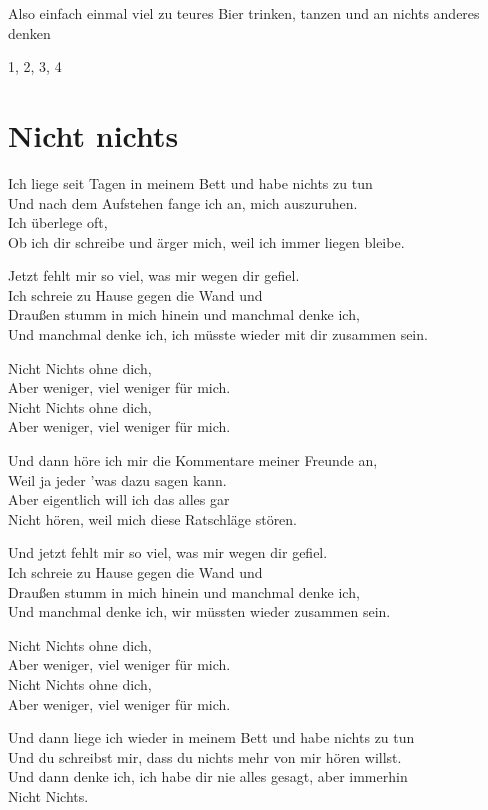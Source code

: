 \documentclass[]{book}
\begin{document}
Also einfach einmal viel zu teures Bier trinken, tanzen und an nichts anderes denken

1, 2, 3, 4

\hypertarget{nicht-nichts-1}{%
\section{Nicht nichts}\label{nicht-nichts-1}}

Ich liege seit Tagen in meinem Bett und habe nichts zu tun\\
Und nach dem Aufstehen fange ich an, mich auszuruhen.\\
Ich überlege oft,\\
Ob ich dir schreibe und ärger mich, weil ich immer liegen bleibe.

Jetzt fehlt mir so viel, was mir wegen dir gefiel.\\
Ich schreie zu Hause gegen die Wand und\\
Draußen stumm in mich hinein und manchmal denke ich,\\
Und manchmal denke ich, ich müsste wieder mit dir zusammen sein.

Nicht Nichts ohne dich,\\
Aber weniger, viel weniger für mich.\\
Nicht Nichts ohne dich,\\
Aber weniger, viel weniger für mich.

Und dann höre ich mir die Kommentare meiner Freunde an,\\
Weil ja jeder 'was dazu sagen kann.\\
Aber eigentlich will ich das alles gar\\
Nicht hören, weil mich diese Ratschläge stören.

Und jetzt fehlt mir so viel, was mir wegen dir gefiel.\\
Ich schreie zu Hause gegen die Wand und\\
Draußen stumm in mich hinein und manchmal denke ich,\\
Und manchmal denke ich, wir müssten wieder zusammen sein.

Nicht Nichts ohne dich,\\
Aber weniger, viel weniger für mich.\\
Nicht Nichts ohne dich,\\
Aber weniger, viel weniger für mich.

Und dann liege ich wieder in meinem Bett und habe nichts zu tun\\
Und du schreibst mir, dass du nichts mehr von mir hören willst.\\
Und dann denke ich, ich habe dir nie alles gesagt, aber immerhin\\
Nicht Nichts.
\end{document}
